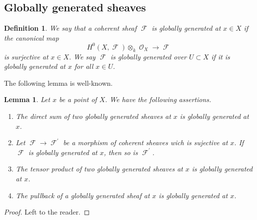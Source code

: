 \documentclass[11pt]{amsart}
\numberwithin{subsection}{section}
\numberwithin{figure}{section}
\numberwithin{table}{section}
\theoremstyle{1}
\newtheorem{lemma}[theorem]{Lemma}
\newtheorem{definition}[theorem]{Definition}
\theoremstyle{2}
\DeclareMathOperator{\Fc}{\mathcal{F}}
\DeclareMathOperator{\Oc}{\mathcal{O}}
\begin{document}
\subsection{Globally generated sheaves}\label{sect_glob}
\begin{definition}
We say that a coherent sheaf $\Fc$ is globally generated at $x \in X$ if the canonical map
\begin{equation*}
H^0(X,\Fc)\otimes_k \Oc_{X} \rightarrow \Fc
\end{equation*}
is surjective at $x \in X$. We say $\Fc$ is globally generated over $U \subset X$ if it is globally generated at $x$ for all $x \in U$. 
\end{definition}
\vspace*{0.2cm}
The following lemma is well-known.
\begin{lemma}\label{prop10}
Let $x$ be a point of $X$. We have the following assertions.
\begin{enumerate}
\item The direct sum of two globally generated sheaves at $x$ is globally generated at $x$.
\item Let $\Fc \rightarrow \Fc^\prime$ be a morphism of coherent sheaves wich is sujective at $x$. If $\Fc$ is globally generated at $x$, then so is $\Fc^\prime$.
\item The tensor product of two globally generated sheaves at $x$ is globally generated at $x$.
\item The pullback of a globally generated sheaf at $x$ is globally generated at $x$.
\end{enumerate}
\end{lemma}
\begin{proof}
Left to the reader.
\end{proof}
\end{document}
